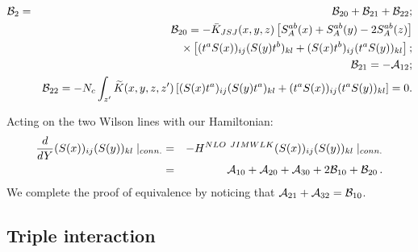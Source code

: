 \documentclass[11pt,a4paper]{article}
\begin{document}
\begin{eqnarray}
{\cal B}_2&=& {\cal B}_{20}+{\cal B}_{21}+{\cal B}_{22};\nonumber \\ 
&&{\cal B}_{20}=- \bar K_{JSJ}(x,y,z)\left[S_{A}^{ab}(x)+S_{A}^{ab}(y)-2S_{A}^{ab}(z)\right] \nonumber \\
&&\times \left[(t^{a}S(x))_{ij}(S(y)t^{b})_{kl}+(S(x)t^{b})_{ij}(t^{a}S(y))_{kl}\right];\nonumber \\
&&{\cal B}_{21}=-{\cal A}_{12};\nonumber \\
&&{\cal B}_{22}= -N_c \int_{z^{\prime}}\widetilde{K}(x,y,z,z^{\prime}) 
\left[(S(x)t^{a})_{ij}(S(y)t^{a})_{kl}+(t^{a}S(x))_{ij}(t^{a}S(y))_{kl}\right]=0.\nonumber \\
\end{eqnarray}


Acting  on the two Wilson lines with our Hamiltonian:
\begin{eqnarray}
\frac{d}{dY}(S(x))_{ij}(S(y))_{kl}\mid_{conn.}&=&-H^{NLO\ JIMWLK}(S(x))_{ij}(S(y))_{kl}\mid_{conn.}\nonumber \\
&=&{\cal A}_{10}+{\cal A}_{20}+{\cal A}_{30}+2 {\cal B}_{10}+{\cal B}_{20}\,.
\end{eqnarray}
We complete the proof of  equivalence by noticing that ${\cal A}_{21}+{\cal A}_{32}={\cal B}_{10}$.
  
  
 \subsection{Triple interaction}
\end{document}
